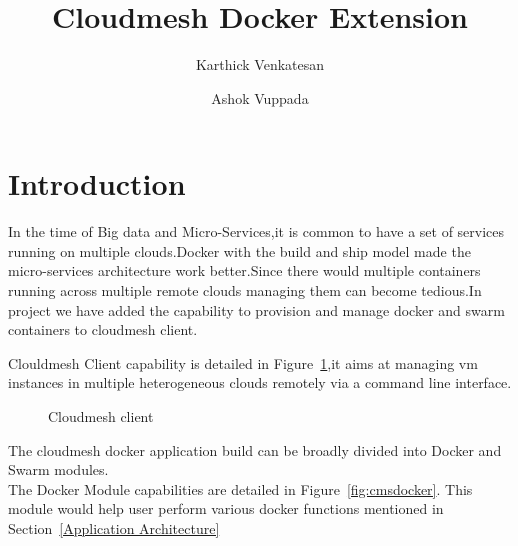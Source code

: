\documentclass[9pt,twocolumn,twoside]{../../styles/osajnl}
\title{Cloudmesh Docker Extension}
\author[1]{Karthick Venkatesan}
\author[2]{Ashok Vuppada}
\affil[1]{School of Informatics and Computing, Bloomington, IN 47408, U.S.A.}
\begin{document}
\maketitle


\section{Introduction}
In the time of Big data and Micro-Services,it is common to have a set of services running on multiple clouds.Docker\cite{www-Docker} with the build and ship model made the micro-services architecture work better.Since there would multiple containers running across multiple remote clouds managing them can become tedious.In project we have added the capability to provision and manage docker\cite{www-Docker} and swarm\cite{www-Swarm} containers to cloudmesh client\cite{las14cloudmeshmultiple}.

Clouldmesh Client\cite{las14cloudmeshmultiple} capability is detailed in Figure~\ref{fig:cmvm},it aims at managing vm instances in multiple heterogeneous clouds remotely via a command line interface.

\begin{figure}[h!]
\centering
{}
\caption{Cloudmesh client }
\label{fig:cmvm}
\end{figure}

The cloudmesh docker application build  can be broadly divided into Docker and Swarm modules.\\

The Docker Module capabilities are detailed in Figure~\ref{fig:cmsdocker}. This module would help user perform various docker functions mentioned in Section~\ref{Application Architecture} 
\end{document}

